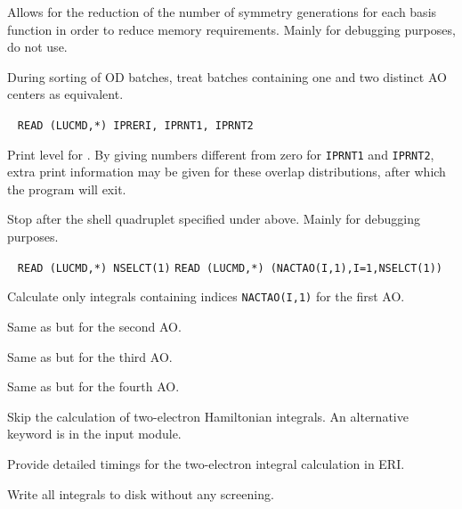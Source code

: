 \begin{description}
Allows for the reduction of the number of symmetry generations for
each basis function in order to reduce memory requirements. Mainly for
debugging purposes, do not use.


\item[\Key{OFFCNT}] During sorting of OD batches, treat batches
containing one and two distinct AO centers as equivalent.

\item[\Key{PRINT}]\verb| |\newline
\verb|READ (LUCMD,*) IPRERI, IPRNT1, IPRNT2|

Print level for {\eri}. By giving numbers different from zero for
\verb|IPRNT1| and \verb|IPRNT2|, extra print information may be given
for these overlap distributions, after which the program will exit.

\item[\Key{RETURN}] Stop after the shell quadruplet specified
under  above. Mainly for debugging purposes.

\item[\Key{SELCT1}]\verb| |\newline
\verb|READ (LUCMD,*) NSELCT(1)|\newline
\verb|READ (LUCMD,*) (NACTAO(I,1),I=1,NSELCT(1))|

Calculate only integrals containing indices \verb|NACTAO(I,1)| for the
first AO.

\item[\Key{SELCT2}] Same as  but for the second AO.

\item[\Key{SELCT3}] Same as  but for the third AO.

\item[\Key{SELCT4}] Same as  but for the fourth AO.

\item[\Key{SKIP}] Skip the calculation of two-electron Hamiltonian
integrals. An alternative keyword is  in the 
input module.

\item[\Key{TIME}] Provide detailed timings for the two-electron
  integral calculation in ERI.

\item[\Key{WRITEA}] Write all integrals to disk without any screening.

\end{description}


